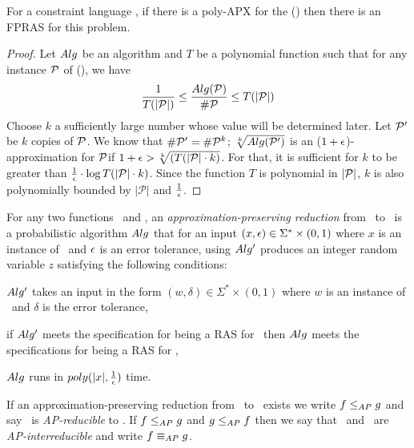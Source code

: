 \begin{lemma}
For a constraint language \mrelset, if there is a poly-APX for
the \ccsp(\mrelset) then there is an FPRAS for this problem.
\end{lemma}

\begin{proof}
Let \(Alg\) be an algorithm and \(T\) be a polynomial function such
that for any instance \(\mathcal{P}\)
of \ccsp(\mrelset), we have 
\[\frac{1}{T(|\mathcal{P}|)} \le \frac{Alg(\mathcal{P})}{\#\mathcal{P}} \le T(|\mathcal{P}|)\]
Choose \(k\) a sufficiently large number whose value
will be determined later. Let \(\mathcal{P}'\) be \(k\) copies of \(\mathcal{P}\)\@.
We know that \(\#\mathcal{P}'=\#\mathcal{P}^k\); \(\sqrt[k]{Alg(\mathcal{P}')}\) is 
an (\(1+\epsilon\))-approximation for \(\mathcal{P}\)\@ if \(1+\epsilon > \sqrt[k]{(T(|\mathcal{P}|\cdot k)}\)\@.
For that, it is sufficient for \(k\) to be greater than
\(\frac{1}{\epsilon}\cdot \log T(|\mathcal{P}|\cdot k)\)\@.
Since the function \(T\) is polynomial in \(|\mathcal{P}|\), \(k\) is also polynomially 
bounded by \(|\mathcal{P}|\) and \(\frac{1}{\epsilon}\)\@.
\end{proof}

For any two functions \mf\ and \mg, 
an \emph{approximation-preserving reduction}
from \mf\ to \mg\ is a probabilistic algorithm \(Alg\) that for an input 
\((x,\epsilon) \in \Sigma^*\times(0,1)\) where \(x\) is an instance of \mf\ and \(\epsilon\) 
is an error tolerance, using \(Alg'\) produces an integer random variable \(z\)
satisfying the following  conditions: \begin{inparaenum}[(i)] \item \(Alg'\) takes 
an input in the form \((w,\delta) \in \Sigma^*\times(0,1)\) where \(w\) is an instance of \mg\
and \(\delta\) is the error tolerance, \item if \(Alg'\) meets the specification for
being a RAS for \mg\ then \(Alg\) meets the specifications for being a RAS for \mf, \item
\(Alg\) runs in \(poly(|x|,\frac{1}{\epsilon})\) time.
\end{inparaenum}

If an approximation-preserving reduction from \mf\ to \mg\ exists we write \(f \le_{AP} g\)
and say \mf\ is \emph{AP-reducible} to \mg. If \(f \le_{AP} g\) and \(g \le_{AP} f\)
then we say that  \mf\ and \mg\ are \emph{AP-interreducible} and write \(f \equiv_{AP} g\)\@. 


